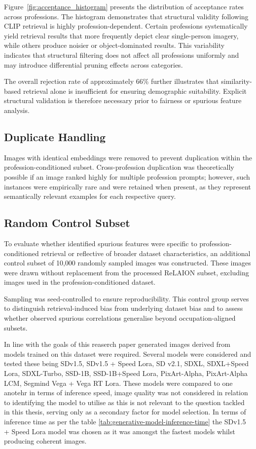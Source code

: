 Figure~\ref{fig:acceptance_histogram} presents the distribution of acceptance rates across professions. The histogram demonstrates that structural validity following CLIP retrieval is highly profession-dependent. Certain professions systematically yield retrieval results that more frequently depict clear single-person imagery, while others produce noisier or object-dominated results. This variability indicates that structural filtering does not affect all professions uniformly and may introduce differential pruning effects across categories.

The overall rejection rate of approximately 66\% further illustrates that similarity-based retrieval alone is insufficient for ensuring demographic suitability. Explicit structural validation is therefore necessary prior to fairness or spurious feature analysis.

\subsection{Duplicate Handling}

Images with identical embeddings were removed to prevent duplication within the profession-conditioned subset. Cross-profession duplication was theoretically possible if an image ranked highly for multiple profession prompts; however, such instances were empirically rare and were retained when present, as they represent semantically relevant examples for each respective query.

\subsection{Random Control Subset}

To evaluate whether identified spurious features were specific to profession-conditioned retrieval or reflective of broader dataset characteristics, an additional control subset of 10{,}000 randomly sampled images was constructed. These images were drawn without replacement from the processed ReLAION subset, excluding images used in the profession-conditioned dataset.

Sampling was seed-controlled to ensure reproducibility. This control group serves to distinguish retrieval-induced bias from underlying dataset bias and to assess whether observed spurious correlations generalise beyond occupation-aligned subsets.

In line with the goals of this reaserch paper generated images derived from models trained on this dataset were required. Several models were considered and tested these being SDv1.5, SDv1.5 + Speed Lora, SD v2.1, SDXL, SDXL+Speed Lora, SDXL-Turbo, SSD-1B,  SSD-1B+Speed Lora, PixArt-Alpha, PixArt-Alpha LCM, Segmind Vega + Vega RT Lora. These models were compared to one anotehr in terms of inference speed, image quality was not considered in relation to identifying the model to utilise as this is not relevant to the question tackled in this thesis, serving only as a secondary factor for model selection. In terms of inference time as per the table \ref{tab:generative-model-inference-time} the SDv1.5 + Speed Lora model was chosen as it was amongst the fastest models whilst producing coherent images.



